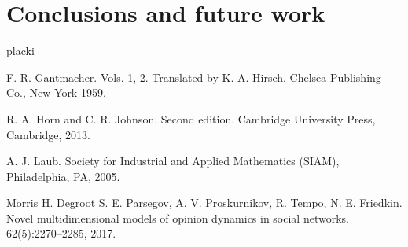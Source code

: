 \documentclass[leqno,12pt]{amsart}
\theoremstyle{remark}
\theoremstyle{remark}
\theoremstyle{remark}
\theoremstyle{definition}
\numberwithin{equation}{section}
\begin{document}
\section{Conclusions and future work}

placki

\begin{thebibliography}{111}

    F. R. Gantmacher.
     Vols. 1, 2. Translated by K. A. Hirsch. Chelsea Publishing Co., New York 1959.

    R. A. Horn and C. R. Johnson.
    \newblock Second edition. Cambridge University Press, Cambridge, 2013.

    A. J. Laub.
     \newblock Society for Industrial and Applied Mathematics (SIAM), Philadelphia, PA, 2005.

     Morris H. Degroot
    S. E. Parsegov, A. V. Proskurnikov, R. Tempo, N. E. Friedkin. \newblock Novel multidimensional models of opinion dynamics in social networks.
     62(5):2270--2285, 2017.

    \end{thebibliography}
\end{document}
